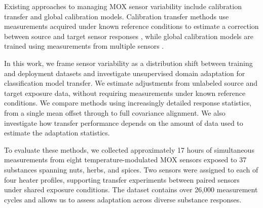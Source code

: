 \documentclass[conference]{IEEEtran}
\begin{document}
Existing approaches to managing MOX sensor variability include calibration transfer and global calibration models. Calibration transfer methods use measurements acquired under known reference conditions to estimate a correction between source and target sensor responses \cite{fernandez2016transfer}, while global calibration models are trained using measurements from multiple sensors \cite{miquelibarz2022global,sumanto2026calibration}.

In this work, we frame sensor variability as a distribution shift between training and deployment datasets and investigate unsupervised domain adaptation for classification model transfer. We estimate adjustments from unlabeled source and target exposure data, without requiring measurements under known reference conditions. We compare methods using increasingly detailed response statistics, from a single mean offset through to full covariance alignment. We also investigate how transfer performance depends on the amount of data used to estimate the adaptation statistics.

To evaluate these methods, we collected approximately 17 hours of simultaneous measurements from eight temperature-modulated MOX sensors exposed to 37 substances spanning nuts, herbs, and spices. Two sensors were assigned to each of four heater profiles, supporting transfer experiments between paired sensors under shared exposure conditions. The dataset contains over 26,000 measurement cycles and allows us to assess adaptation across diverse substance responses.
\end{document}

